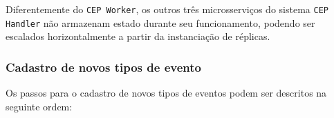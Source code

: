 

Diferentemente do \texttt{CEP Worker}, os outros três microsserviços do sistema \texttt{CEP Handler} não armazenam estado durante seu funcionamento, podendo ser escalados horizontalmente a partir da instanciação de réplicas. %



\subsubsection{Cadastro de novos tipos de evento}
Os passos para o cadastro de novos tipos de eventos podem ser descritos na seguinte ordem:

